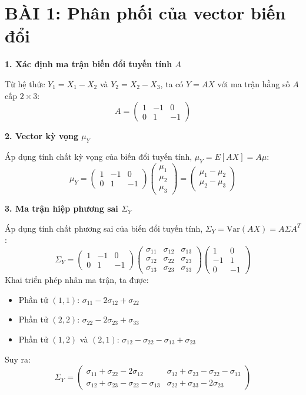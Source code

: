 \documentclass[12pt, a4paper]{article}
\begin{document}
\newpage

\section*{BÀI 1: Phân phối của vector biến đổi}

\textbf{1. Xác định ma trận biến đổi tuyến tính $A$}

Từ hệ thức $Y_1 = X_1 - X_2$ và $Y_2 = X_2 - X_3$, ta có $Y = AX$ với ma trận hằng số $A$ cấp $2 \times 3$:
\[ A = \begin{pmatrix} 1 & -1 & 0 \\ 0 & 1 & -1 \end{pmatrix} \]

\textbf{2. Vector kỳ vọng $\mu_Y$}

Áp dụng tính chất kỳ vọng của biến đổi tuyến tính, $\mu_Y = E[AX] = A\mu$:
\[ \mu_Y = \begin{pmatrix} 1 & -1 & 0 \\ 0 & 1 & -1 \end{pmatrix} \begin{pmatrix} \mu_1 \\ \mu_2 \\ \mu_3 \end{pmatrix} = \begin{pmatrix} \mu_1 - \mu_2 \\ \mu_2 - \mu_3 \end{pmatrix} \]

\textbf{3. Ma trận hiệp phương sai $\Sigma_Y$}

Áp dụng tính chất phương sai của biến đổi tuyến tính, $\Sigma_Y = \text{Var}(AX) = A\Sigma A^T$:
\[ \Sigma_Y = \begin{pmatrix} 1 & -1 & 0 \\ 0 & 1 & -1 \end{pmatrix} \begin{pmatrix} \sigma_{11} & \sigma_{12} & \sigma_{13} \\ \sigma_{12} & \sigma_{22} & \sigma_{23} \\ \sigma_{13} & \sigma_{23} & \sigma_{33} \end{pmatrix} \begin{pmatrix} 1 & 0 \\ -1 & 1 \\ 0 & -1 \end{pmatrix} \]
Khai triển phép nhân ma trận, ta được:
\begin{itemize}
    \item Phần tử $(1,1)$: $\sigma_{11} - 2\sigma_{12} + \sigma_{22}$
    \item Phần tử $(2,2)$: $\sigma_{22} - 2\sigma_{23} + \sigma_{33}$
    \item Phần tử $(1,2)$ và $(2,1)$: $\sigma_{12} - \sigma_{22} - \sigma_{13} + \sigma_{23}$
\end{itemize}
Suy ra:
\[ \Sigma_Y = \begin{pmatrix} \sigma_{11} + \sigma_{22} - 2\sigma_{12} & \sigma_{12} + \sigma_{23} - \sigma_{22} - \sigma_{13} \\ \sigma_{12} + \sigma_{23} - \sigma_{22} - \sigma_{13} & \sigma_{22} + \sigma_{33} - 2\sigma_{23} \end{pmatrix} \]
\end{document}
